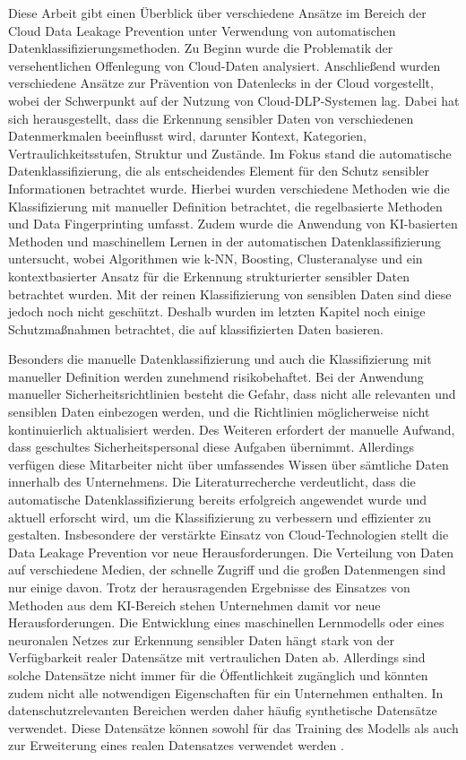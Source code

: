 Diese Arbeit gibt einen Überblick über verschiedene Ansätze im Bereich der Cloud Data Leakage Prevention unter Verwendung von automatischen Datenklassifizierungsmethoden. Zu Beginn wurde die Problematik der versehentlichen Offenlegung von Cloud-Daten analysiert. Anschließend wurden verschiedene Ansätze zur Prävention von Datenlecks in der Cloud vorgestellt, wobei der Schwerpunkt auf der Nutzung von Cloud-DLP-Systemen lag. Dabei hat sich herausgestellt, dass die Erkennung sensibler Daten von verschiedenen Datenmerkmalen beeinflusst wird, darunter Kontext, Kategorien, Vertraulichkeitsstufen, Struktur und Zustände. Im Fokus stand die automatische Datenklassifizierung, die als entscheidendes Element für den Schutz sensibler Informationen betrachtet wurde. Hierbei wurden verschiedene Methoden wie die Klassifizierung mit manueller Definition betrachtet, die regelbasierte Methoden und Data Fingerprinting umfasst. Zudem wurde die Anwendung von KI-basierten Methoden und maschinellem Lernen in der automatischen Datenklassifizierung untersucht, wobei Algorithmen wie k-NN, Boosting, Clusteranalyse und ein kontextbasierter Ansatz für die Erkennung strukturierter sensibler Daten betrachtet wurden. Mit der reinen Klassifizierung von sensiblen Daten sind diese jedoch noch nicht geschützt. Deshalb wurden im letzten Kapitel noch einige Schutzmaßnahmen betrachtet, die auf klassifizierten Daten basieren.

Besonders die manuelle Datenklassifizierung und auch die Klassifizierung mit manueller Definition werden zunehmend risikobehaftet. Bei der Anwendung manueller Sicherheitsrichtlinien besteht die Gefahr, dass nicht alle relevanten und sensiblen Daten einbezogen werden, und die Richtlinien möglicherweise nicht kontinuierlich aktualisiert werden. Des Weiteren erfordert der manuelle Aufwand, dass geschultes Sicherheitspersonal diese Aufgaben übernimmt. Allerdings verfügen diese Mitarbeiter nicht über umfassendes Wissen über sämtliche Daten innerhalb des Unternehmens.
Die Literaturrecherche verdeutlicht, dass die automatische Datenklassifizierung bereits erfolgreich angewendet wurde und aktuell erforscht wird, um die Klassifizierung zu verbessern und effizienter zu gestalten. Insbesondere der verstärkte Einsatz von Cloud-Technologien stellt die Data Leakage Prevention vor neue Herausforderungen. Die Verteilung von Daten auf verschiedene Medien, der schnelle Zugriff und die großen Datenmengen sind nur einige davon. Trotz der herausragenden Ergebnisse des Einsatzes von Methoden aus dem KI-Bereich stehen Unternehmen damit vor neue Herausforderungen. Die Entwicklung eines maschinellen Lernmodells oder eines neuronalen Netzes zur Erkennung sensibler Daten hängt stark von der Verfügbarkeit realer Datensätze mit vertraulichen Daten ab. Allerdings sind solche Datensätze nicht immer für die Öffentlichkeit zugänglich und könnten zudem nicht alle notwendigen Eigenschaften für ein Unternehmen enthalten. In datenschutzrelevanten Bereichen werden daher häufig synthetische Datensätze verwendet. Diese Datensätze können sowohl für das Training des Modells als auch zur Erweiterung eines realen Datensatzes verwendet werden \cite{Kuzina.2023}.

